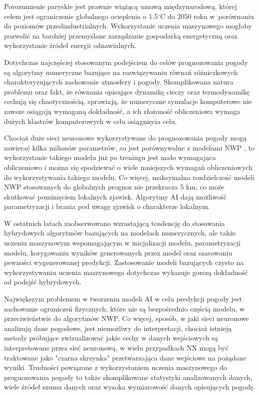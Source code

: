 Porozumienie paryskie jest prawnie wiążącą umową międzynarodową,
której celem jest ograniczenie globalnego ocieplenia o 1.5$^{\circ}$C
do 2050 roku w~porównaniu do poziomów przedindustrialnych. Wykorzystanie
uczenia maszynowego mogłoby pozwolić na bardziej przemyślane zarządzanie
gospodarką energetyczną oraz wykorzystanie źródeł energii odnawialnych.

Dotychczas najczęściej stosowanym podejściem do celów prognozowania
pogody są algorytmy numeryczne bazujące na rozwiązywaniu równań różniczkowych
charakteryzujących zachowanie atmosfery i pogody. Skomplikowana natura
problemu oraz fakt, że równania opisujące dynamikę cieczy oraz termodynamikę
cechują się chaotycznością, sprawiają, że numeryczne symulacje komputerowe
nie zawsze osiągają wymaganą dokładność, a ich złożoność obliczeniowa
wymaga dużych klastrów komputerowych w celu osiągnięcia celu.

Chociaż duże sieci neuronowe wykorzystywane do prognozowania pogody
mogą zawierać kilka milionów parametrów, co jest porównywalne z modelami
NWP \cite{can-dl-beat-numerical}, to wykorzystanie takiego modelu już po treningu
jest mało wymagająca obliczeniowo i można się spodziewać o wiele mniejszych wymagań
obliczeniowych do wykorzystywania takiego modelu. Co więcej, maksymalna rozdzielczość
modeli NWP stosowanych do globalnych prognoz nie przekracza 5 km, 
co może skutkować pominięciem lokalnych zjawisk. Algorytmy AI dają możliwość
parametryzacji i brania pod uwagę zjawisk o charakterze lokalnym.

W ostatnich latach zaobserwowano wzrastającą tendencję do stosowania hybrydowych
algorytmów bazujących na modelach numerycznych, ale także uczeniu maszynowym
wspomagającym w inicjalizacji modelu, parametryzacji modelu, korygowaniu
wyników generowanych przez model oraz szacowaniu pewności wygenerowanej
predykcji. Zastosowanie modeli bazujących czysto na wykorzystywaniu uczenia
maszynowego dotychczas wykazuje gorszą dokładność od podejść hybrydowych.

Największym problemem w tworzeniu modeli AI w celu predykcji pogody jest
zachowanie ograniczeń fizycznych, które nie są bezpośrednio częścią modelu,
w przeciwieństwie do algorytmów NWP. Co więcej, sposób, w jaki sieci neuronowe
analizują dane pogodowe, jest niemożliwy do interpretacji, chociaż istnieją
metody próbujące zwizualizować jakie cechy w danych wejściowych są interpretowane
przez sieć neuronową, w wielu przypadkach NN mogą być traktowane jako "czarna 
skrzynka" przetwarzająca dane wejściowe na pożądane wyniki. Trudności powiązane
z wykorzystaniem uczenia maszynowego do prognozowania pogody to także skomplikowane
statystyki analizowanych danych, wiele źródeł szumu danych oraz wysoka wymiarowość
danych opisujących pogodę.

